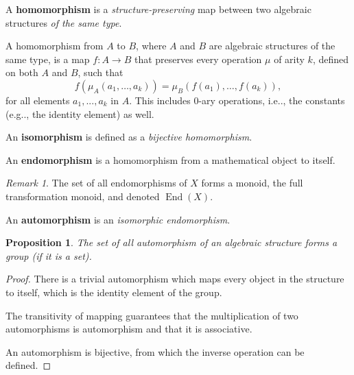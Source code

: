 \documentclass[12pt, letterpaper]{article}
\makeatletter
\newcommand{\End}{\operatorname{End}}
\newcommand\ie{i.e\@ifnextchar.{}{.\@}}
\newcommand\eg{e.g\@ifnextchar.{}{.\@}}
\newtheorem{prop}{Proposition}[section]
\theoremstyle{definition}
\theoremstyle{remark}
\newtheorem*{rem*}{Remark}
\theoremstyle{definition}
\theoremstyle{plain}
\numberwithin{equation}{section}
\makeatother
\begin{document}
	\begin{def*}[homomorphism]
		A \textbf{homomorphism} is a \textit{structure-preserving} map between two algebraic structures \textit{of the same type}.
	\end{def*}
	
	A homomorphism from $A$ to $B$, where $A$ and $B$ are algebraic structures of the same type, is a map $f\colon A\to B$ that preserves every operation $\mu$ of arity $k$, defined on both $A$ and $B$, such that
	\begin{equation}
		f\left(\mu_{A}\left(a_{1},\dots ,a_{k}\right)\right)=\mu_{B}\left(f\left(a_{1}\right),\dots ,f\left(a_{k}\right)\right),
	\end{equation}
	for all elements $a_{1},...,a_{k}$ in $A$.	
	This includes 0-ary operations, \ie, the constants (\eg, the identity element) as well.
	
	\begin{def*}[isomorphism]
		An \textbf{isomorphism} is defined as a \textit{bijective homomorphism}.
	\end{def*}
	
	\begin{def*}[endomorphism]
		An \textbf{endomorphism} is a homomorphism from a mathematical object to itself. 
	\end{def*}
	\begin{rem*}
		The set of all endomorphisms of $X$ forms a monoid, the full transformation monoid, and denoted $\End(X)$.
	\end{rem*}
	
	\begin{def*}[automorphism]
		An \textbf{automorphism} is an \textit{isomorphic endomorphism}.
	\end{def*}
	
	\begin{prop}
		The set of all automorphism of an algebraic structure forms a group (if it is a set).
	\end{prop}
	\begin{proof}
		There is a trivial automorphism which maps every object in the structure to itself, which is the identity element of the group.
		
		The transitivity of mapping guarantees that the multiplication of two automorphisms is automorphism and that it is associative.
		
		An automorphism is bijective, from which the inverse operation can be defined.
	\end{proof}
\end{document}
